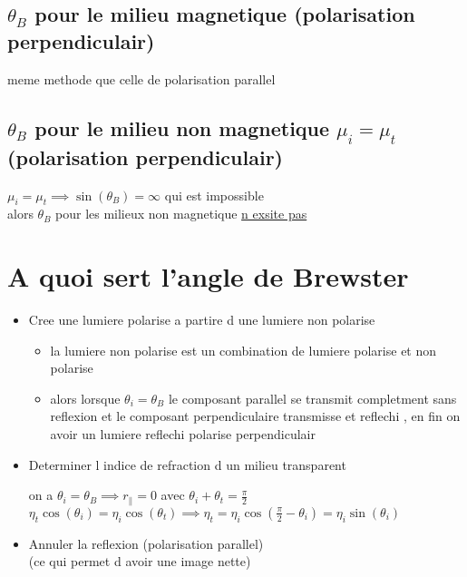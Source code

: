 \documentclass[12pt]{book}
\begin{document}
            \subsection{$\theta_B$ pour le milieu magnetique (polarisation perpendiculair)}
            meme methode que celle de polarisation parallel
            \begin{center}
            \end{center}
            \subsection{$\theta_B$ pour le milieu non magnetique $\mu_i = \mu_t$ (polarisation perpendiculair)}
            $\mu_i = \mu_t \implies \sin(\theta_B) = \infty$ qui est impossible \\
            alors $\theta_B$ pour les milieux non magnetique \underline{n exsite pas}
        \section{A quoi sert l'angle de Brewster}
        \begin{itemize}
            \item Cree une lumiere polarise a partire d une lumiere non polarise 
                \begin{center}
                    \begin{itemize}
                        \item la lumiere non polarise est un combination de lumiere polarise et non polarise 
                        \item alors lorsque $\theta_i = \theta_B$ le composant parallel se transmit completment sans reflexion et le composant perpendiculaire transmisse et reflechi , en fin on avoir un lumiere reflechi polarise perpendiculair
                    \end{itemize}
                \end{center}
            \item Determiner l indice de refraction d un milieu transparent 
                \begin{center}
                    on a $\theta_i = \theta_B \implies r_\parallel = 0 $ avec $\theta_i + \theta_t = \frac{\pi}{2}$ \\
                    $\eta_t\cos(\theta_i) =\eta_i\cos(\theta_t) \implies \eta_t = \eta_i\cos(\frac{\pi}{2} - \theta_i) = \eta_i\sin(\theta_i)$ \\
                \end{center}
            \item  Annuler la reflexion (polarisation parallel)\\
                    (ce qui permet d avoir une image nette)
        \end{itemize}
        \pagebreak
\end{document}
